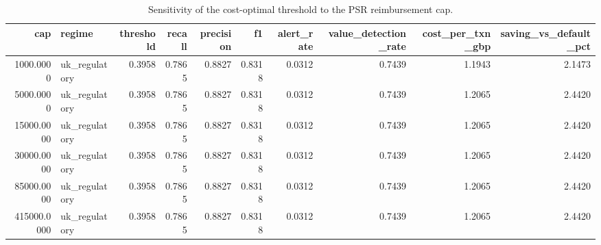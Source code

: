 \begin{table}
\caption{Sensitivity of the cost-optimal threshold to the PSR reimbursement cap.}
\label{tab:table5_sensitivity_cap}
\begin{tabular}{rlrrrrrrrr}
\toprule
cap & regime & threshold & recall & precision & f1 & alert\_rate & value\_detection\_rate & cost\_per\_txn\_gbp & saving\_vs\_default\_pct \\
\midrule
1000.0000 & uk\_regulatory & 0.3958 & 0.7865 & 0.8827 & 0.8318 & 0.0312 & 0.7439 & 1.1943 & 2.1473 \\
5000.0000 & uk\_regulatory & 0.3958 & 0.7865 & 0.8827 & 0.8318 & 0.0312 & 0.7439 & 1.2065 & 2.4420 \\
15000.0000 & uk\_regulatory & 0.3958 & 0.7865 & 0.8827 & 0.8318 & 0.0312 & 0.7439 & 1.2065 & 2.4420 \\
30000.0000 & uk\_regulatory & 0.3958 & 0.7865 & 0.8827 & 0.8318 & 0.0312 & 0.7439 & 1.2065 & 2.4420 \\
85000.0000 & uk\_regulatory & 0.3958 & 0.7865 & 0.8827 & 0.8318 & 0.0312 & 0.7439 & 1.2065 & 2.4420 \\
415000.0000 & uk\_regulatory & 0.3958 & 0.7865 & 0.8827 & 0.8318 & 0.0312 & 0.7439 & 1.2065 & 2.4420 \\
\bottomrule
\end{tabular}
\end{table}
